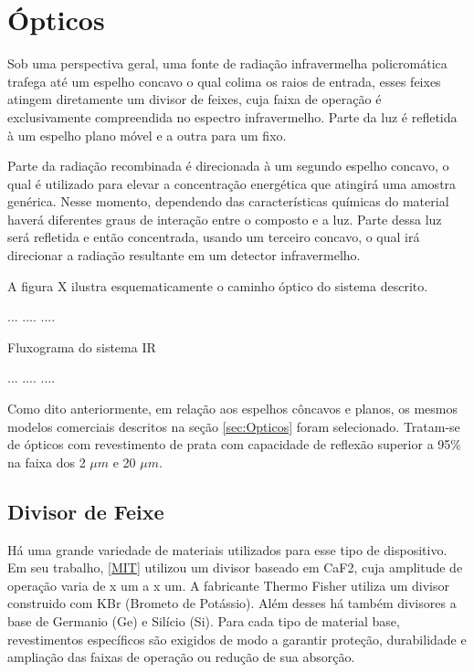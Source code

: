 \documentclass[oneside,openright,12pt]{ufsm_2021} %
\begin{document}
    \section{Ópticos}
        \par Sob uma perspectiva geral, uma fonte de radiação infravermelha policromática trafega até um espelho concavo o qual colima os raios de entrada, esses feixes atingem diretamente um divisor de feixes, cuja faixa de operação é exclusivamente compreendida no espectro infravermelho. Parte da luz é refletida à um espelho plano móvel e a outra para um fixo.
        \par Parte da radiação recombinada é direcionada à um segundo espelho concavo, o qual é utilizado para elevar a concentração energética que atingirá uma amostra genérica. Nesse momento, dependendo das características químicas do material haverá diferentes graus de interação entre o composto e a luz. Parte dessa luz será refletida e então concentrada, usando um terceiro concavo, o qual irá direcionar a radiação resultante em um detector infravermelho.  
        \par A figura X ilustra esquematicamente o caminho óptico do sistema descrito.

        \par ...    ....    ....
        \par Fluxograma do sistema IR
        \par ...    ....    ....
        
        \par Como dito anteriormente, em relação aos espelhos côncavos e planos, os mesmos modelos comerciais descritos na seção \ref{sec:Opticos} foram selecionado. Tratam-se de ópticos com revestimento de prata com capacidade de reflexão superior a 95\% na faixa dos 2 $\mu m$ e 20 $\mu m$.
        
        \subsection{Divisor de Feixe}
            \par Há uma grande variedade de materiais utilizados para esse tipo de dispositivo. Em seu trabalho, \ref{MIT} utilizou um divisor baseado em CaF2, cuja amplitude de operação varia de x um a x um. A fabricante Thermo Fisher utiliza um divisor construido com KBr (Brometo de Potássio). Além desses há também divisores a base de Germanio (Ge) e Silício (Si). Para cada tipo de material base, revestimentos específicos são exigidos de modo a garantir proteção, durabilidade e ampliação das faixas de operação ou redução de sua absorção. 
            
\end{document}

